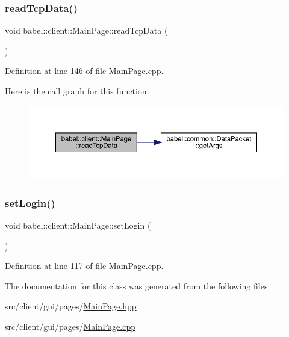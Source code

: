 \subsubsection{\texorpdfstring{read\+Tcp\+Data()}{readTcpData()}}
{\footnotesize\ttfamily void babel\+::client\+::\+Main\+Page\+::read\+Tcp\+Data (\begin{DoxyParamCaption}{ }\end{DoxyParamCaption})\hspace{0.3cm}{\ttfamily [protected]}}



Definition at line 146 of file Main\+Page.\+cpp.

Here is the call graph for this function\+:\nopagebreak
\begin{figure}[H]
\begin{center}
\leavevmode
\includegraphics[width=350pt]{classbabel_1_1client_1_1_main_page_ae2447ec4e19e7694afc106ccb52a0d43_cgraph}
\end{center}
\end{figure}
\mbox{\label{classbabel_1_1client_1_1_main_page_a04bbc090f594f37b254e2d7d751fbdb9}} 
\subsubsection{\texorpdfstring{set\+Login()}{setLogin()}}
{\footnotesize\ttfamily void babel\+::client\+::\+Main\+Page\+::set\+Login (\begin{DoxyParamCaption}{ }\end{DoxyParamCaption})}



Definition at line 117 of file Main\+Page.\+cpp.



The documentation for this class was generated from the following files\+:\begin{DoxyCompactItemize}
\item 
src/client/gui/pages/\mbox{\hyperlink{_main_page_8hpp}{Main\+Page.\+hpp}}\item 
src/client/gui/pages/\mbox{\hyperlink{_main_page_8cpp}{Main\+Page.\+cpp}}\end{DoxyCompactItemize}
